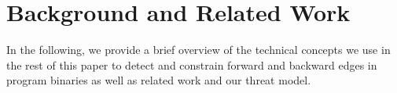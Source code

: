 \section{Background and Related Work}
\label{C++ Bad Forward Indirect Calls}

In the following, we provide a brief overview of the technical
concepts we use in the rest of this paper to detect and constrain 
forward and backward edges in program binaries as well as related work 
and our threat model.


